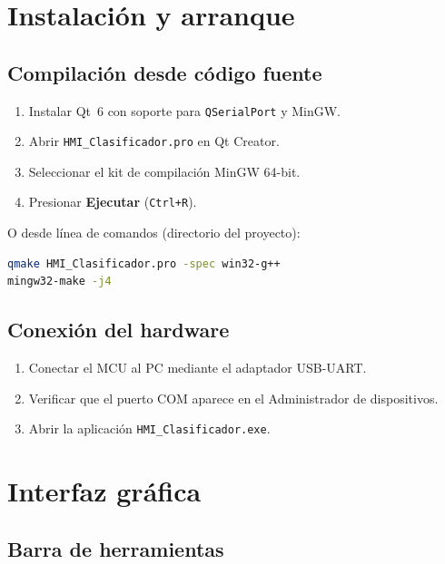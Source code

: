 \documentclass[12pt,a4paper]{report}
\newcommand{\file}[1]{\texttt{#1}}
\begin{document}
\chapter{Instalación y arranque}

\section{Compilación desde código fuente}

\begin{enumerate}
  \item Instalar Qt~6 con soporte para \texttt{QSerialPort} y MinGW.
  \item Abrir \file{HMI\_Clasificador.pro} en Qt Creator.
  \item Seleccionar el kit de compilación MinGW 64-bit.
  \item Presionar \textbf{Ejecutar} (\texttt{Ctrl+R}).
\end{enumerate}

O desde línea de comandos (directorio del proyecto):

\begin{lstlisting}[language=bash,caption={Compilación por consola}]
qmake HMI_Clasificador.pro -spec win32-g++
mingw32-make -j4
\end{lstlisting}

\section{Conexión del hardware}

\begin{enumerate}
  \item Conectar el MCU al PC mediante el adaptador USB-UART.
  \item Verificar que el puerto COM aparece en el Administrador de dispositivos.
  \item Abrir la aplicación \texttt{HMI\_Clasificador.exe}.
\end{enumerate}

\chapter{Interfaz gráfica}

\section{Barra de herramientas}
\end{document}
